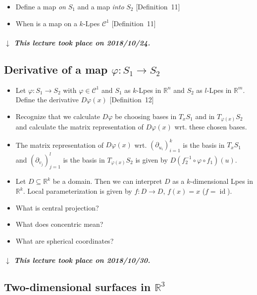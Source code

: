 \documentclass{article}
\numberwithin{lecref}{section}
\newcommand{\dateref}[1]{%
  \begin{mdframed}[backgroundcolor=gray!10,innerbottommargin=0pt,innertopmargin=0pt]
    \paragraph{\textit{$\downarrow$ This lecture took place on #1.}}%
  \end{mdframed}%
}
\begin{document}
\begin{itemize}
  \item Define a map \emph{on} $S_1$ and a map \emph{into} $S_2$ [Definition~11]
  \item When is a map on a $k$-Lpes $\mathcal C^1$ [Definition~11]
\end{itemize}

\dateref{2018/10/24}

\subsection*{Derivative of a map $\varphi: S_1 \to S_2$}

\begin{itemize}
  \item Let $\varphi: S_1 \to S_2$ with $\varphi \in \mathcal C^1$ and $S_1$ as $k$-Lpes in $\mathbb R^n$ and $S_2$ as $l$-Lpes in $\mathbb R^m$. Define the derivative $D\varphi(x)$ [Definition~12]
  \item Recognize that we calculate $D\varphi$ be choosing bases in $T_x S_1$ and in $T_{\varphi(x)} S_2$ and calculate the matrix representation of $D\varphi(x)$ wrt. these chosen bases.
  \item The matrix representation of $D\varphi(x)$ wrt. $(\partial_{u_i})_{i=1}^k$ is the basis in $T_x S_1$ and $(\partial_{v_j})_{j=1}^l$ is the basis in $T_{\varphi(x)} S_2$ is given by $D(f_2^{-1} \circ \varphi \circ f_1)(u)$.
  \item Let $D \subseteq \mathbb R^k$ be a domain. Then we can interpret $D$ as a $k$-dimensional Lpes in $\mathbb R^k$. Local parameterization is given by $f: D \to D$, $f(x) = x$ ($f = \operatorname{id}$).
  \item What is central projection?
  \item What does concentric mean?
  \item What are spherical coordinates?
\end{itemize}

\dateref{2018/10/30}

\subsection*{Two-dimensional surfaces in $\mathbb R^3$}
\end{document}
